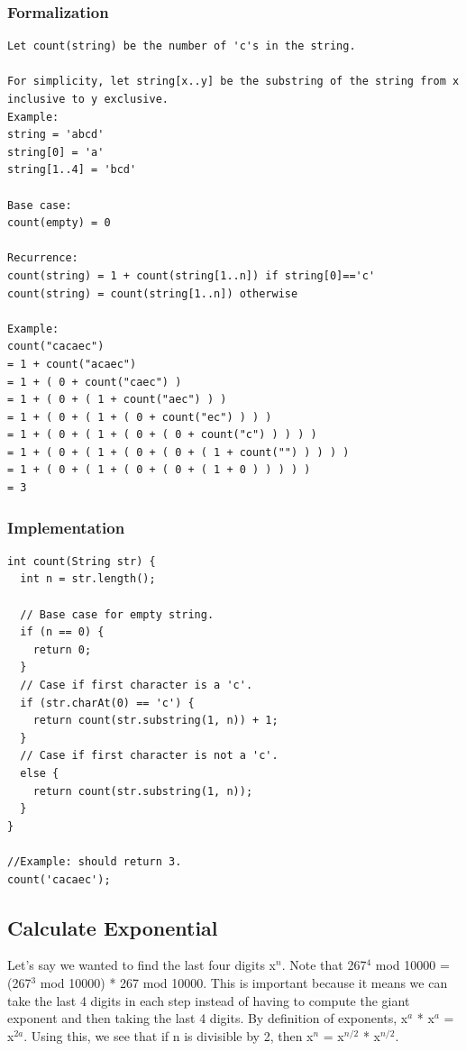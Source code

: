 \documentclass[11pt,oneside]{book}
\begin{document}
\subsubsection{Formalization}

\begin{lstlisting}
Let count(string) be the number of 'c's in the string.

For simplicity, let string[x..y] be the substring of the string from x inclusive to y exclusive.
Example: 
string = 'abcd'
string[0] = 'a'
string[1..4] = 'bcd'

Base case:
count(empty) = 0

Recurrence:
count(string) = 1 + count(string[1..n]) if string[0]=='c' 
count(string) = count(string[1..n]) otherwise

Example:
count("cacaec")
= 1 + count("acaec") 
= 1 + ( 0 + count("caec") )
= 1 + ( 0 + ( 1 + count("aec") ) )
= 1 + ( 0 + ( 1 + ( 0 + count("ec") ) ) )
= 1 + ( 0 + ( 1 + ( 0 + ( 0 + count("c") ) ) ) )
= 1 + ( 0 + ( 1 + ( 0 + ( 0 + ( 1 + count("") ) ) ) )
= 1 + ( 0 + ( 1 + ( 0 + ( 0 + ( 1 + 0 ) ) ) ) )
= 3
\end{lstlisting}

\subsubsection{Implementation}

\begin{lstlisting}
int count(String str) {
  int n = str.length();

  // Base case for empty string.
  if (n == 0) {
    return 0;
  }
  // Case if first character is a 'c'.
  if (str.charAt(0) == 'c') {
    return count(str.substring(1, n)) + 1;
  }
  // Case if first character is not a 'c'.
  else {
    return count(str.substring(1, n));
  }
}

//Example: should return 3.
count('cacaec');
\end{lstlisting}

\subsection{Calculate Exponential}

Let's say we wanted to find the last four digits x$^{n}$. Note that 267$^{4}$ mod 10000 = (267$^{3}$ mod 10000) * 267 mod 10000. This is important because it means we can take the last 4 digits in each step instead of having to compute the giant exponent and then taking the last 4 digits. By definition of exponents, x$^{a}$ * x$^{a}$ = x$^{2a}$. Using this, we see that if n is divisible by 2, then x$^{n}$ = x$^{n/2}$ * x$^{n/2}$.
\end{document}
